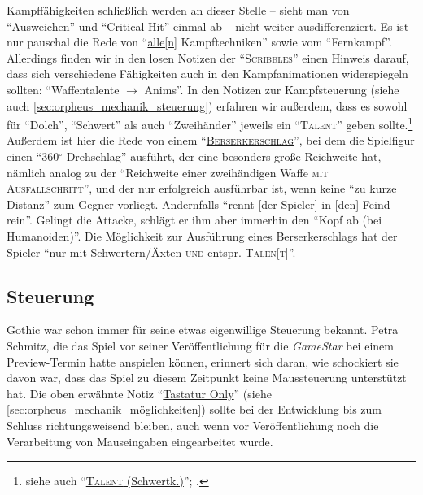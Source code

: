 \documentclass[a5paper,pagesize,numbers=noenddot]{scrbook}
\begin{document}
Kampffähigkeiten schließlich werden an dieser Stelle -- sieht man von \enquote{Ausweichen}\autocite[S.~5]{orpheus_gildensystem} und \enquote{Critical Hit}\autocite[S.~1]{orpheus_gildensystem} einmal ab -- nicht weiter ausdifferenziert.
Es ist nur pauschal die Rede von \enquote{\uline{alle[n]} Kampftechniken}\autocite[S.~8]{orpheus_gildensystem} sowie vom \enquote{Fernkampf}.\autocite[S.~13, 15]{orpheus_gildensystem}
Allerdings finden wir in den losen Notizen der \enquote{\textsc{Scribbles}} einen Hinweis darauf, dass sich verschiedene Fähigkeiten auch in den Kampfanimationen widerspiegeln sollten:
\enquote{Waffentalente $\rightarrow$ Anims}.\autocite[S.~7]{orpheus_b_scribbles}
In den Notizen zur Kampfsteuerung (siehe auch \autoref{sec:orpheus_mechanik_steuerung}) erfahren wir außerdem, dass es sowohl für \enquote{Dolch}, \enquote{Schwert} als auch \enquote{Zweihänder} jeweils ein \enquote{\textsc{Talent}} geben sollte.\footnote{\autocite[S.~4\,f.;]{orpheus_kampfsteuerung} siehe auch \enquote{\uline{\textsc{Talent} (Schwertk.)}}; \autocite[S.~1]{orpheus_kampfsteuerung}.}
Außerdem ist hier die Rede von einem \enquote{\textsc{\uline{Berserkerschlag}}}, bei dem die Spielfigur einen \enquote{360$^{\circ}$ Drehschlag} ausführt,\autocite[S.~1]{orpheus_kampfsteuerung} der eine besonders große Reichweite hat, nämlich analog zu der \enquote{Reichweite einer zweihändigen Waffe \textsc{mit Ausfallschritt}}, und der nur erfolgreich ausführbar ist, wenn keine \enquote{zu kurze Distanz} zum Gegner vorliegt.
Andernfalls \enquote{rennt [der Spieler] in [den] Feind rein}.
Gelingt die Attacke, schlägt er ihm aber immerhin den \enquote{Kopf ab (bei Humanoiden)}.
Die Möglichkeit zur Ausführung eines Berserkerschlags hat der Spieler \enquote{nur mit Schwertern/Äxten \textsc{und} entspr. \textsc{Talen[t]}}.\autocite[S.~3]{orpheus_kampfsteuerung}


\subsection{Steuerung}\label{sec:orpheus_mechanik_steuerung}
Gothic war schon immer für seine etwas eigenwillige Steuerung bekannt.
Petra Schmitz, die das Spiel vor seiner Veröffentlichung für die \textit{GameStar} bei einem Preview-Termin hatte anspielen können, erinnert sich daran, wie schockiert sie davon war, dass das Spiel zu diesem Zeitpunkt keine Maussteuerung unterstützt hat.\autocite{schmitz_maussteuerung_2021}
Die oben erwähnte Notiz \enquote{\uline{Tastatur Only}}\autocite[S.~1]{orpheus_interface} (siehe  \autoref{sec:orpheus_mechanik_möglichkeiten}) sollte bei der Entwicklung bis zum Schluss richtungsweisend bleiben, auch wenn vor Veröffentlichung noch die Verarbeitung von Mauseingaben eingearbeitet wurde.
\end{document}
